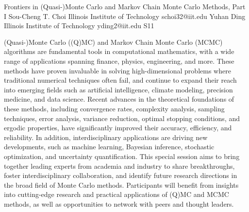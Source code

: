 \begin{session}
 {Frontiers in (Quasi-)Monte Carlo and Markov Chain Monte Carlo Methods, Part I}%
 {Sou-Cheng T.  Choi}%
 {Illinois Institute of Technology}%
 {schoi32@iit.edu}%
 {Yuhan Ding}%
 {Illinois Institute of Technology}%
 {yding2@iit.edu}%
 {S11}%
{}

 (Quasi-)Monte Carlo ((Q)MC) and Markov Chain Monte Carlo (MCMC) algorithms are fundamental tools in computational mathematics, with a wide range of applications spanning finance, physics, engineering, and more. These methods have proven invaluable in solving high-dimensional problems where traditional numerical techniques often fail, and continue to expand their reach into emerging fields such as artificial intelligence, climate modeling, precision medicine, and data science.
 Recent advances in the theoretical foundations of these methods, including convergence rates, complexity analysis, sampling techniques, error analysis, variance reduction, optimal stopping conditions, and ergodic properties, have significantly improved their accuracy, efficiency, and reliability. In addition, interdisciplinary applications are driving new developments, such as machine learning, Bayesian inference, stochastic optimization, and uncertainty quantification.
 This special session aims to bring together leading experts from academia and industry to share breakthroughs, foster interdisciplinary collaboration, and identify future research directions in the broad field of Monte Carlo methods. Participants will benefit from insights into cutting-edge research and practical applications of (Q)MC and MCMC methods, as well as opportunities to network with peers and thought leaders.
\end{session}



\clearpage

